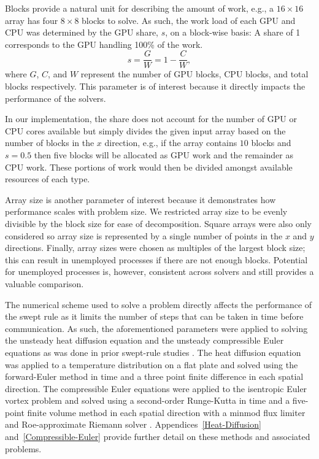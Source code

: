 \documentclass[preprints,article,accept,moreauthors,pdftex]{Definitions/mdpi}
\begin{document}
\par
Blocks provide a natural unit for describing the amount of work, e.g., a $16\times16$ array has four $8\times8$ blocks to solve. As such, the work load of each GPU and CPU was determined by the GPU share, $s$, on a block-wise basis: A share of 1 corresponds to the GPU handling 100\% of the work.  
\begin{equation}
    \label{share-equation}
    s = \frac{G}{W} = 1-\frac{C}{W},
\end{equation}
where $G$, $C$, and $W$ represent the number of GPU blocks, CPU blocks, and total blocks respectively. This parameter is of interest because it directly impacts the performance of the solvers.

In our implementation, the share does not account for the number of GPU or CPU cores available but simply divides the given input array based on the number of blocks in the $x$ direction, e.g., if the array contains $10$ blocks and $s=0.5$ then five blocks will be allocated as GPU work and the remainder as CPU work. These portions of work would then be divided amongst available resources of each type. 
\par
Array size is another parameter of interest because it demonstrates how performance scales with problem size. We restricted array size to be evenly divisible by the block size for ease of decomposition. Square arrays were also only considered so array size is represented by a single number of points in the $x$ and $y$ directions. Finally, array sizes were chosen as multiples of the largest block size; this can result in unemployed processes if there are not enough blocks. Potential for unemployed processes is, however, consistent across solvers and still provides a valuable comparison.

\par
The numerical scheme used to solve a problem directly affects the performance of the swept rule as it limits the number of steps that can be taken in time before communication. As such, the aforementioned parameters were applied to solving the unsteady heat diffusion equation and the unsteady compressible Euler equations as was done in prior swept-rule studies \cite{Alhubail2016ThePDEs,Alhubail2018ThePDEs,Magee2018AcceleratingDecomposition, Magee2020ApplyingSystems}. The heat diffusion equation was applied to a temperature distribution on a flat plate and solved using the forward-Euler method in time and a three point finite difference in each spatial direction. The compressible Euler equations were applied to the isentropic Euler vortex problem and solved using a second-order Runge-Kutta in time and a five-point finite volume method in each spatial direction with a minmod flux limiter and Roe-approximate Riemann solver \cite{SpiegelAMethods,Leveque2002FiniteProblems}. Appendices~\ref{Heat-Diffusion} and~\ref{Compressible-Euler} provide further detail on these methods and associated problems.
\end{document}
